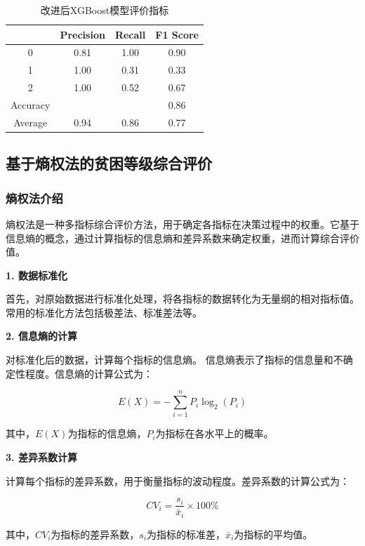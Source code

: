 \documentclass{article}
\begin{document}
\begin{table}[htbp]
  \centering
  \caption{改进后XGBoost模型评价指标}
  \label{performance_XGBoost_modified}
  \begin{tabular}{cccc}
    \toprule
              & Precision & Recall & F1 Score \\
    \midrule
    0         & 0.81      & 1.00   & 0.90 \\
    1         & 1.00      & 0.31   & 0.33 \\
    2         & 1.00      & 0.52   & 0.67 \\
    Accuracy  &           &        & 0.86 \\
    Average   & 0.94      & 0.86   & 0.77 \\
    \bottomrule
  \end{tabular}
\end{table}

\subsection{基于熵权法的贫困等级综合评价}

\subsubsection{熵权法介绍}

熵权法是一种多指标综合评价方法，用于确定各指标在决策过程中的权重。它基于信息熵的概念，通过计算指标的信息熵和差异系数来确定权重，进而计算综合评价值。\cite{reference2}

\textbf{1. 数据标准化}

首先，对原始数据进行标准化处理，将各指标的数据转化为无量纲的相对指标值。
常用的标准化方法包括极差法、标准差法等。

\textbf{2. 信息熵的计算}

对标准化后的数据，计算每个指标的信息熵。
信息熵表示了指标的信息量和不确定性程度。信息熵的计算公式为：

\[
E(X) = -\sum_{i=1}^{n} P_i \log_2(P_i)
\]

其中，\(E(X)\)为指标的信息熵，\(P_i\)为指标在各水平上的概率。

\textbf{3. 差异系数计算}

计算每个指标的差异系数，用于衡量指标的波动程度。差异系数的计算公式为：

\[
CV_i = \frac{{s_i}}{{\bar{x}_i}} \times 100\%
\]

其中，\(CV_i\)为指标的差异系数，\(s_i\)为指标的标准差，\(\bar{x}_i\)为指标的平均值。
\end{document}
